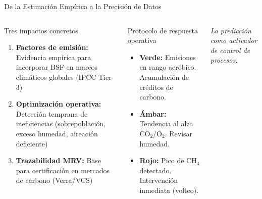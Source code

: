 \documentclass[aspectratio=169, 11pt]{beamer}
\begin{document}
\begin{frame}{De la Estimación Empírica a la Precisión de Datos}
    \begin{columns}[T]
        \begin{block}{Tres impactos concretos}
            \begin{enumerate}
                \item \textbf{Factores de emisión:} Evidencia empírica para incorporar BSF en marcos climáticos globales (IPCC Tier 3)
                \item \textbf{Optimización operativa:} Detección temprana de ineficiencias (sobrepoblación, exceso humedad, aireación deficiente)
                \item \textbf{Trazabilidad MRV:} Base para certificación en mercados de carbono (Verra/VCS)
            \end{enumerate}
        \end{block}

        \begin{alertblock}{Protocolo de respuesta operativa}
            \begin{itemize}
                \item \textcolor{verdeOK}{\textbf{Verde:}} Emisiones en rango aeróbico. Acumulación de créditos de carbono.
                \item \textcolor{naranjaAlerta}{\textbf{Ámbar:}} Tendencia al alza CO$_2$/O$_2$. Revisar humedad.
                \item \textcolor{rojoAlerta}{\textbf{Rojo:}} Pico de CH$_4$ detectado. Intervención inmediata (volteo).
            \end{itemize}
        \end{alertblock}

        \vspace{0.2cm}
        \centering
        \footnotesize \textit{La predicción como activador de control de procesos.}
    \end{columns}
\end{frame}
\end{document}

